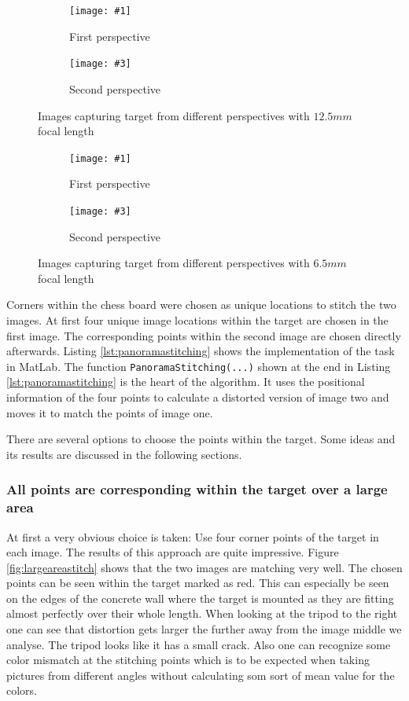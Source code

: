 \documentclass[
a4paper,     %
12pt         %
]{scrartcl}  %
\newcommand{\sidebysidepic}[6]{
\begin{figure}[ht!]%
\begin{subfigure}{.5\textwidth}%
  \centering%
  \texttt{[image: \#1]}%
  \caption{#2}%
\end{subfigure}%
\begin{subfigure}{.5\textwidth}%
  \centering%
  \texttt{[image: \#3]}%
  \caption{#4}%
\end{subfigure}%
\caption{#5}%
\label{#6}%
\end{figure}%
}
\begin{document}
\sidebysidepic{./Bildg_Messtechnik_Lab/PanoramaStitching/images/image_1.png}
{First perspective}
{./Bildg_Messtechnik_Lab/PanoramaStitching/images/image_2.png}
{Second perspective}
{Images capturing target from different perspectives with $12.5mm$ focal length}
{fig:photo12.5mm}

\sidebysidepic{./Bildg_Messtechnik_Lab/PanoramaStitching/images/image_b1.png}
{First perspective}
{./Bildg_Messtechnik_Lab/PanoramaStitching/images/image_b2.png}
{Second perspective}
{Images capturing target from different perspectives with $6.5mm$ focal length}
{fig:photo6.5mm}

Corners within the chess board were chosen as unique locations to stitch the two images.
At first four unique image locations within the target are chosen in the first image.
The corresponding points within the second image are chosen directly afterwards.
Listing \ref{lst:panoramastitching} shows the implementation of the task in MatLab.
The function \lstinline{PanoramaStitching(...)} shown at the end in Listing \ref{lst:panoramastitching} is the heart of the algorithm.
It uses the positional information of the four points to calculate a distorted version of image two and moves it to match the points of image one.



There are several options to choose the points within the target.
Some ideas and its results are discussed in the following sections.

\subsubsection{All points are corresponding within the target over a large area}

At first a very obvious choice is taken: Use four corner points of the target in each image.
The results of this approach are quite impressive.
Figure \ref{fig:largeareastitch} shows that the two images are matching very well.
The chosen points can be seen within the target marked as red.
This can especially be seen on the edges of the concrete wall where the target is mounted as they are fitting almost perfectly over their whole length.
When looking at the tripod to the right one can see that distortion gets larger the further away from the image middle we analyse.
The tripod looks like it has a small crack.
Also one can recognize some color mismatch at the stitching points which is to be expected when taking pictures from different angles without calculating som sort of mean value for the colors.
\end{document}

